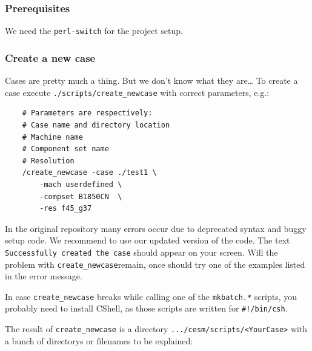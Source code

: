 \documentclass[]{article}
\begin{document}
\subsubsection{Prerequisites}\label{prerequisites}

We need the \texttt{perl-switch} for the project setup.

\subsubsection{Create a new case}\label{create-a-new-case}

Cases are pretty much a thing. But we don't know what they are\ldots{}
To create a case execute \texttt{./scripts/create\_newcase} with correct
parameters, e.g.:

\begin{verbatim}
    # Parameters are respectively:
    # Case name and directory location
    # Machine name
    # Component set name
    # Resolution
    /create_newcase -case ./test1 \
        -mach userdefined \
        -compset B1850CN  \
        -res f45_g37
\end{verbatim}

In the original repository many errors occur due to deprecated syntax
and buggy setup code. We recommend to use our updated version of the
code. The text \texttt{Successfully\ created\ the\ case} should appear
on your screen. Will the problem with \texttt{create\_newcase}remain,
once should try one of the examples listed in the error message.

In case \texttt{create\_newcase} breaks while calling one of the
\texttt{mkbatch.*} scripts, you probably need to install CShell, as
those scripts are written for \texttt{\#!/bin/csh}.

The result of \texttt{create\_newcase} is a directory
\texttt{.../cesm/scripts/\textless{}YourCase\textgreater{}} with a bunch
of directorys or filenames to be explained:
\end{document}
